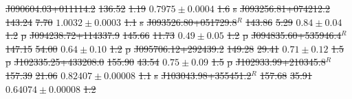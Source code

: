 \documentclass[11pt, a4paper]{book}
\providecommand{\DIFdeltex}[1]{{\protect\color{red}\sout{#1}}}                      %
\providecommand{\DIFdelFL}[1]{\DIFdel{#1}} %
\providecommand{\DIFdel}[1]{\texorpdfstring{\DIFdeltex{#1}}{}} %
\begin{document}
    \DIFdelFL{J090604.03+011114.2 }%
\DIFdelFL{136.52 }%
\DIFdelFL{1.19 }%
\DIFdelFL{$0.7975 \pm 0.0004$ }%
\DIFdelFL{1.6 }%
\DIFdelFL{s}%
    \DIFdelFL{J093256.81+074212.2 }%
\DIFdelFL{143.24 }%
\DIFdelFL{7.70 }%
\DIFdelFL{$1.0032 \pm 0.0003$ }%
\DIFdelFL{1.1 }%
\DIFdelFL{s}%
    \DIFdelFL{J093526.80+051729.8${}^R$ }%
\DIFdelFL{143.86 }%
\DIFdelFL{5.29 }%
\DIFdelFL{$0.84 \pm 0.04$ }%
\DIFdelFL{1.2 }%
\DIFdelFL{p}%
    \DIFdelFL{J094238.72+114337.9 }%
\DIFdelFL{145.66 }%
\DIFdelFL{11.73 }%
\DIFdelFL{$0.49 \pm 0.05$ }%
\DIFdelFL{1.2 }%
\DIFdelFL{p}%
    \DIFdelFL{J094835.60+535946.4${}^R$ }%
\DIFdelFL{147.15 }%
\DIFdelFL{54.00 }%
\DIFdelFL{$0.64 \pm 0.10$ }%
\DIFdelFL{1.2 }%
\DIFdelFL{p}%
    \DIFdelFL{J095706.12+292439.2 }%
\DIFdelFL{149.28 }%
\DIFdelFL{29.41 }%
\DIFdelFL{$0.71 \pm 0.12$ }%
\DIFdelFL{1.5 }%
\DIFdelFL{p}%
    \DIFdelFL{J102335.25+433208.0 }%
\DIFdelFL{155.90 }%
\DIFdelFL{43.54 }%
\DIFdelFL{$0.75 \pm 0.09$ }%
\DIFdelFL{1.5 }%
\DIFdelFL{p}%
    \DIFdelFL{J102933.99+210345.8${}^R$ }%
\DIFdelFL{157.39 }%
\DIFdelFL{21.06 }%
\DIFdelFL{$0.82407 \pm 0.00008$ }%
\DIFdelFL{1.1 }%
\DIFdelFL{s}%
    \DIFdelFL{J103043.98+355451.2${}^R$ }%
\DIFdelFL{157.68 }%
\DIFdelFL{35.91 }%
\DIFdelFL{$0.64074 \pm 0.00008$ }%
\DIFdelFL{1.2 }%
\end{document}

